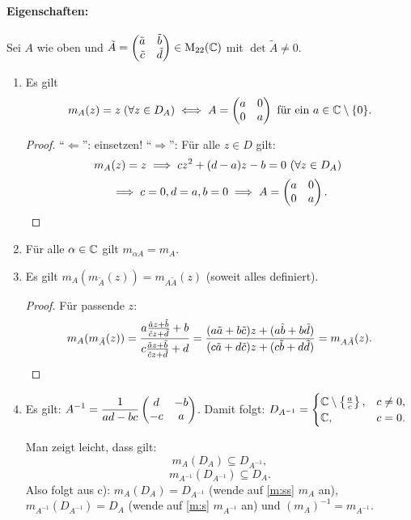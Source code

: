 \documentclass[a4paper,twoside,DIV15,BCOR12mm]{scrbook}
\begin{document}
\paragraph{Eigenschaften:} Sei $A$ wie oben und $\tilde{A} = \left(\!\!\!\begin{array}{c c}\tilde{a}&\tilde{b}\\\tilde{c}&\tilde{d}\end{array}\!\!\!\right) \in
\mathrm{M}_{22}(\mathbb{C})$ mit $\det \tilde{A} \neq 0$.
\begin{enumerate}
\item Es gilt
  \[m_A(z) = z \; (\forall z \in D_A) \iff A = \left(\!\!\!\begin{array}{c c}a&0\\0&a\end{array}\!\!\!\right) \text { für ein } a \in \mathbb{C} \setminus \{0\}.\]
  \begin{proof}
    "`$\Leftarrow$"': einsetzen! "`$\Rightarrow$"': Für alle $z\in D$ gilt:
    \[m_A(z)=z \implies cz^2 + (d-a)z - b = 0 \text{ (}\forall z\in D_A\text{) }\]
    \[\implies c=0, d=a, b=0 \implies A = \left(\!\!\!\begin{array}{c c}a&0\\0&a\end{array}\!\!\!\right). \qedhere\]
  \end{proof}
\item Für alle $\alpha\in\mathbb{C}$ gilt $m_{\alpha A} = m_A$.
\item Es gilt $m_A(m_{\tilde{A}}(z)) = m_{A\tilde{A}}(z)$ (soweit alles definiert).
\begin{proof} Für passende $z$:
  \[m_A(m_{\tilde{A}}(z)) =
  \frac{a\frac{\tilde{a}z+\tilde{b}}{\tilde{c}z+\tilde{d}}+b}{c\frac{\tilde{a}z+\tilde{b}}{\tilde{c}z+\tilde{d}}+d} =
  \frac{(a\tilde{a}+b\tilde{c})z+(a\tilde{b}+b\tilde{d})}{(c\tilde{a}+d\tilde{c})z+(c\tilde{b}+d\tilde{d})} =
  m_{A\tilde{A}}(z). \qedhere\]
\end{proof}
\item Es gilt: $\displaystyle A^{-1} = \frac{1}{ad-bc}\left(\!\!\!\begin{array}{c c}d&-b\\-c&a\end{array}\!\!\!\right)$. Damit folgt: $\displaystyle D_{A^{-1}}=
  \begin{cases} \mathbb{C}\setminus\left\{\frac{a}{c}\right\},&c\neq 0,\\\mathbb{C},&c=0.\end{cases}$

Man zeigt leicht, dass gilt:
\[\label{m:s}m_A(D_A) \subseteq D_{A^{-1}},\tag{$\ast$}\]
\[\label{m:ss}m_{A^{-1}}(D_{A^{-1}}) \subseteq D_A.\tag{$\ast\ast$}\]
Also folgt aus c): $m_A(D_A) = D_{A^{-1}}$ (wende auf \eqref{m:ss} $m_A$ an), $m_{A^{-1}}(D_{A^{-1}}) = D_A$ (wende auf \eqref{m:s} $m_{A^{-1}}$ an) und $(m_A)^{-1} = m_{A^{-1}}$.


\end{enumerate}
\end{document}
